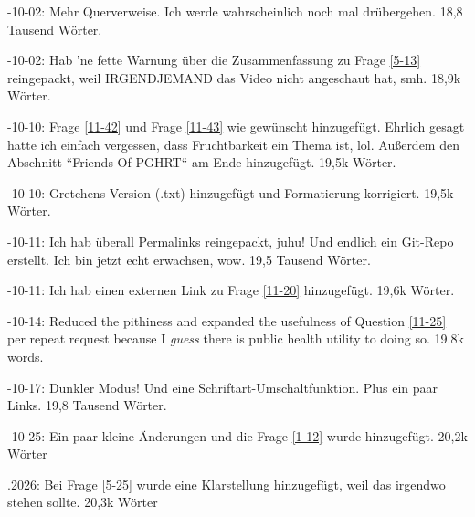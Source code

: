 \documentclass{article}
\begin{document}
-10-02: Mehr Querverweise. Ich werde wahrscheinlich noch mal drübergehen. 18,8 Tausend Wörter.

-10-02: Hab 'ne fette Warnung über die Zusammenfassung zu Frage \ref{5-13} reingepackt, weil IRGENDJEMAND das Video nicht angeschaut hat, smh. 18,9k Wörter.

-10-10: Frage \ref{11-42} und Frage \ref{11-43} wie gewünscht hinzugefügt. Ehrlich gesagt hatte ich einfach vergessen, dass Fruchtbarkeit ein Thema ist, lol. Außerdem den Abschnitt “Friends Of PGHRT“ am Ende hinzugefügt. 19,5k Wörter.

-10-10: Gretchens Version (.txt) hinzugefügt und Formatierung korrigiert. 19,5k Wörter.

-10-11: Ich hab überall Permalinks reingepackt, juhu! Und endlich ein Git-Repo erstellt. Ich bin jetzt echt erwachsen, wow. 19,5 Tausend Wörter.

-10-11: Ich hab einen externen Link zu Frage \ref{11-20} hinzugefügt. 19,6k Wörter.

-10-14: Reduced the pithiness and expanded the usefulness of Question \ref{11-25} per repeat request because I \textit{guess} there is public health utility to doing so. 19.8k words.

-10-17: Dunkler Modus! Und eine Schriftart-Umschaltfunktion. Plus ein paar Links. 19,8 Tausend Wörter.

-10-25: Ein paar kleine Änderungen und die Frage \ref{1-12} wurde hinzugefügt. 20,2k Wörter

.2026: Bei Frage \ref{5-25} wurde eine Klarstellung hinzugefügt, weil das irgendwo stehen sollte. 20,3k Wörter
\end{document}
